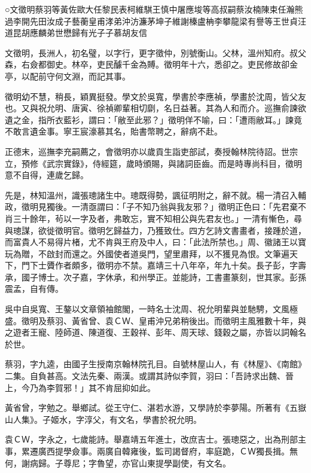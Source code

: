 
\begin{pinyinscope}
○文徵明蔡羽等黃佐歐大任黎民表柯維騏王慎中屠應埈等高叔嗣蔡汝楠陳束任瀚熊過李開先田汝成子藝蘅皇甫涍弟沖汸濂茅坤子維謝榛盧柟李攀龍梁有譽等王世貞汪道昆胡應麟弟世懋歸有光子子慕胡友信

文徵明，長洲人，初名璧，以字行，更字徵仲，別號衡山。父林，溫州知府。叔父森，右僉都御史。林卒，吏民醵千金為賻。徵明年十六，悉卻之。吏民修故卻金亭，以配前守何文淵，而記其事。

徵明幼不慧，稍長，穎異挺發。學文於吳寬，學書於李應禎，學畫於沈周，皆父友也。又與祝允明、唐寅、徐禎卿輩相切劘，名日益著。其為人和而介。巡撫俞諫欲遺之金，指所衣藍衫，謂曰：「敝至此邪？」徵明佯不喻，曰：「遭雨敝耳。」諫竟不敢言遺金事。寧王宸濠慕其名，貽書幣聘之，辭病不赴。

正德末，巡撫李充嗣薦之，會徵明亦以歲貢生詣吏部試，奏授翰林院待詔。世宗立，預修《武宗實錄》，侍經筵，歲時頒賜，與諸詞臣齒。而是時專尚科目，徵明意不自得，連歲乞歸。

先是，林知溫州，識張璁諸生中。璁既得勢，諷征明附之，辭不就。楊一清召入輔政，徵明見獨後。一清亟謂曰：「子不知乃翁與我友邪？」徵明正色曰：「先君棄不肖三十餘年，茍以一字及者，弗敢忘，實不知相公與先君友也。」一清有慚色，尋與璁謀，欲徙徵明官。徵明乞歸益力，乃獲致仕。四方乞詩文書畫者，接踵於道，而富貴人不易得片楮，尤不肯與王府及中人，曰：「此法所禁也。」周、徽諸王以寶玩為贈，不啟封而還之。外國使者道吳門，望里肅拜，以不獲見為恨。文筆遍天下，門下士贗作者頗多，徵明亦不禁。嘉靖三十八年卒，年九十矣。長子彭，字壽承，國子博士。次子嘉，字休承，和州學正。並能詩，工書畫篆刻，世其家。彭孫震孟，自有傳。

吳中自吳寬、王鏊以文章領袖館閣，一時名士沈周、祝允明輩與並馳騁，文風極盛。徵明及蔡羽、黃省曾、袁ＣＷ、皇甫沖兄弟稍後出。而徵明主風雅數十年，與之遊者王寵、陸師道、陳道復、王穀祥、彭年、周天球、錢穀之屬，亦皆以詞翰名於世。

蔡羽，字九逵，由國子生授南京翰林院孔目。自號林屋山人，有《林屋》、《南館》二集。自負甚高。文法先秦、兩漢。或謂其詩似李賀，羽曰：「吾詩求出魏、晉上，今乃為李賀邪！」其不肯屈抑如此。

黃省曾，字勉之。舉鄉試。從王守仁、湛若水游，又學詩於李夢陽。所著有《五嶽山人集》。子姬水，字淳父，有文名，學書於祝允明。

袁ＣＷ，字永之，七歲能詩。舉嘉靖五年進士，改庶吉士。張璁惡之，出為刑部主事，累遷廣西提學僉事。兩廣自韓雍後，監司謁督府，率庭跪，ＣＷ獨長揖。無何，謝病歸。子尊尼；字魯望，亦官山東提學副使，有文名。


\end{pinyinscope}
